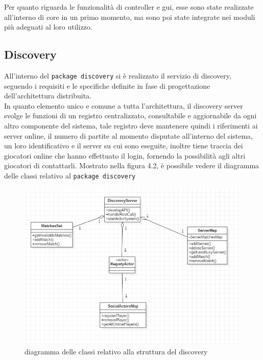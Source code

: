   Per quanto riguarda le funzionalità di controller e gui, esse sono state realizzate all'interno di core in un primo momento, ma sono poi state integrate nei moduli più adeguati al loro utilizzo.

\subsection {Discovery}\label{subsec:details:discovery}
All'interno del \texttt{package discovery} si è realizzato il servizio di discovery, seguendo i requisiti e le specifiche definite in fase di progettazione dell'architettura distribuita.\\
In quanto elemento unico e comune a tutta l'architettura, il discovery server svolge le funzioni di un registro centralizzato, consultabile e aggiornabile da ogni altro componente del sistema, tale registro deve mantenere quindi i riferimenti ai server online, il numero di partite al momento disputate all'interno del sistema, un loro identificativo e il server su cui sono eseguite, inoltre tiene traccia dei giocatori online che hanno effettuato il login, fornendo la possibilità agli altri giocatori di contattarli.
Mostrato nella figura 4.2, è possibile vedere il diagramma delle classi relativo al \texttt{package discovery}

\begin{figure}
  \includegraphics[width=\textwidth,height=\textheight,keepaspectratio]{discoveryArchitecture}
   \caption{diagramma delle classi relativo alla struttura del discovery}
\end{figure}

